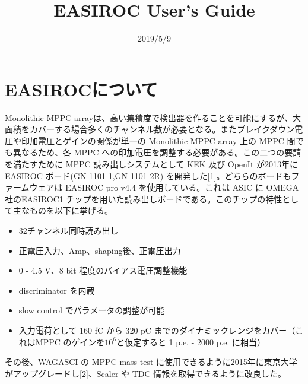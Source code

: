 \documentclass{jsarticle}
\begin{document}
\title{EASIROC User's Guide}
\date{2019/5/9}
\maketitle


\newpage
\section{EASIROCについて}
Monolithic MPPC arrayは、高い集積度で検出器を作ることを可能にするが、大面積をカバーする場合多くのチャンネル数が必要となる。またブレイクダウン電圧や印加電圧とゲインの関係が単一の Monolithic MPPC array 上の MPPC 間でも異なるため、各 MPPC への印加電圧を調整する必要がある。この二つの要請を満たすために MPPC 読み出しシステムとして KEK 及び OpenIt が2013年に EASIROC ボード(GN-1101-1,GN-1101-2R) を開発した[1]。どちらのボードもファームウェアは EASIROC pro v4.4 を使用している。これは ASIC に OMEGA 社のEASIROC1 チップを用いた読み出しボードである。このチップの特性として主なものを以下に挙げる。
\begin{itemize}
\item 32チャンネル同時読み出し
\item 正電圧入力、Amp、shaping後、正電圧出力
\item 0 - 4.5 V、8 bit 程度のバイアス電圧調整機能
\item discriminator を内蔵
\item slow control でパラメータの調整が可能
\item 入力電荷として 160 fC から 320 pC までのダイナミックレンジをカバー（これはMPPC のゲインを$10^6$と仮定すると 1 p.e. - 2000 p.e. に相当）
\end{itemize}

その後、WAGASCI の MPPC mass test に使用できるように2015年に東京大学がアップグレードし[2]、Scaler や TDC 情報を取得できるように改良した。

\newpage
\end{document}
